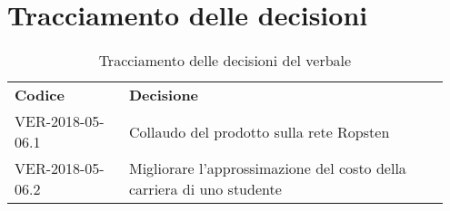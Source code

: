 \documentclass[VER-2018-05-06.tex]{subfiles}
\begin{document}
\section{Tracciamento delle decisioni}
\begin{table}[H]
	\begin{center}
		\begin{tabu} to 
			\tableHeaderStyle
			\textbf{Codice} & \textbf{Decisione} \\
			VER-2018-05-06.1 & Collaudo del prodotto sulla rete Ropsten \\
			VER-2018-05-06.2 & Migliorare l'approssimazione del costo della carriera di uno studente \\
		\end{tabu}
		\caption{Tracciamento delle decisioni del verbale}
	\end{center}
\end{table}
\end{document}
